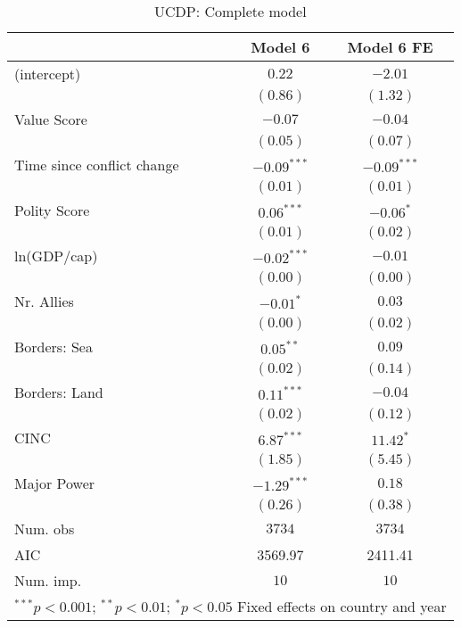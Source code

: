 
\begin{table}
\begin{center}
\begin{tabular}{l c c}
\toprule
 & Model 6 & Model 6 FE \\
\midrule
(intercept)                & $0.22$        & $-2.01$       \\
                           & $(0.86)$      & $(1.32)$      \\
Value Score                & $-0.07$       & $-0.04$       \\
                           & $(0.05)$      & $(0.07)$      \\
Time since conflict change & $-0.09^{***}$ & $-0.09^{***}$ \\
                           & $(0.01)$      & $(0.01)$      \\
Polity Score               & $0.06^{***}$  & $-0.06^{*}$   \\
                           & $(0.01)$      & $(0.02)$      \\
ln(GDP/cap)                & $-0.02^{***}$ & $-0.01$       \\
                           & $(0.00)$      & $(0.00)$      \\
Nr. Allies                 & $-0.01^{*}$   & $0.03$        \\
                           & $(0.00)$      & $(0.02)$      \\
Borders: Sea               & $0.05^{**}$   & $0.09$        \\
                           & $(0.02)$      & $(0.14)$      \\
Borders: Land              & $0.11^{***}$  & $-0.04$       \\
                           & $(0.02)$      & $(0.12)$      \\
CINC                       & $6.87^{***}$  & $11.42^{*}$   \\
                           & $(1.85)$      & $(5.45)$      \\
Major Power                & $-1.29^{***}$ & $0.18$        \\
                           & $(0.26)$      & $(0.38)$      \\
\midrule
Num. obs                   & $3734$        & $3734$        \\
AIC                        & 3569.97       & 2411.41       \\
Num. imp.                  & $10$          & $10$          \\
\bottomrule
\multicolumn{3}{l}{\scriptsize{$^{***}p<0.001$; $^{**}p<0.01$; $^{*}p<0.05$ 
 Fixed effects on country and year}}
\end{tabular}
\caption{UCDP: Complete model}
\label{UCDP_3}
\end{center}
\end{table}
